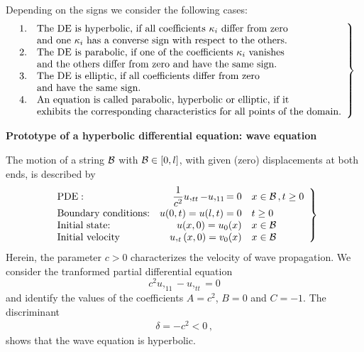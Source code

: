Depending on the signs we consider the following cases:
\begin{eqnarray}
\left. 
\begin{array}{ll}
1. & \textnormal{The DE is hyperbolic, if all coefficients 
          $\kappa_i$ differ from zero} \\
   & \textnormal{and one $\kappa_i$ has a converse sign
          with respect to the others.} \\
2. & \textnormal{The DE is parabolic, if one of the coefficients
          $\kappa_i$ vanishes} \\
   & \textnormal{and the others differ from zero and have the 
         same sign.} \\ 
3. & \textnormal{The DE is elliptic, if all coefficients 
         differ from zero} \\
   & \textnormal{and have the same sign.} \\
4. & \textnormal{An equation is called parabolic, 
         hyperbolic or elliptic, if it} \\
   & \textnormal{exhibits the corresponding characteristics 
         for all points of the domain.}
\end{array}
\right\}
\end{eqnarray}










{\bf Prototype of a hyperbolic differential equation: 
wave equation}

The motion of a string ${\cal B}$ with ${\cal B} \in [0,l]$, 
with given (zero) displacements at both ends, is described 
by 
%
\begin{eqnarray}
\left. 
\begin{array}{lrl}
\mbox{PDE}: & \dfrac{1}{c^2} u,_{tt} - u,_{11} = 0 & x \in {\cal B}
\, , t \ge 0 \\ [1.1ex]
\mbox{Boundary conditions:}   & u(0,t) = u(l,t) =  0 & t \ge 0 \\
\mbox{Initial state:}         & u(x,0) = u_0 (x) & x \in {\cal B} \\
\mbox{Initial velocity} & u,_t (x,0) = v_0 (x) & x \in {\cal B}
\end{array}
\right\}
\end{eqnarray}
%
Herein, the parameter $c>0$ characterizes the velocity 
of wave propagation. 
We consider the tranformed partial differential equation 
%
\begin{equation}
c^2 u,_{11} - u,_{tt} = 0
\end{equation}
%
and identify the values of the coefficients 
$A=c^2$, $B=0$ and $C=-1$. 
The discriminant 
%
\begin{eqnarray}
\delta=-c^2 < 0 \, ,
\end{eqnarray}
%
shows that the wave equation is hyperbolic. 





